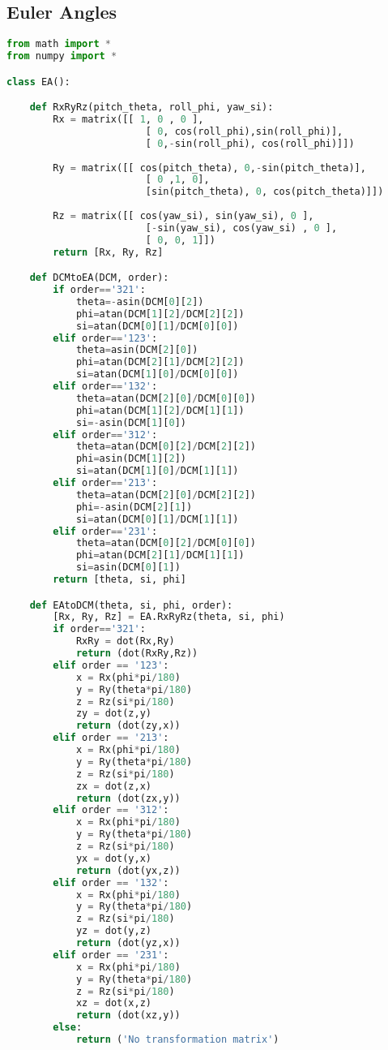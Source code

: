 \subsection{Euler Angles}
\begin{lstlisting}[language=python, caption= EA.py]
from math import *
from numpy import *

class EA():

    def RxRyRz(pitch_theta, roll_phi, yaw_si):
        Rx = matrix([[ 1, 0 , 0 ],
                        [ 0, cos(roll_phi),sin(roll_phi)],
                        [ 0,-sin(roll_phi), cos(roll_phi)]])
        
        Ry = matrix([[ cos(pitch_theta), 0,-sin(pitch_theta)],
                        [ 0 ,1, 0],
                        [sin(pitch_theta), 0, cos(pitch_theta)]])
        
        Rz = matrix([[ cos(yaw_si), sin(yaw_si), 0 ],
                        [-sin(yaw_si), cos(yaw_si) , 0 ],
                        [ 0, 0, 1]])
        return [Rx, Ry, Rz]

    def DCMtoEA(DCM, order):
        if order=='321':
            theta=-asin(DCM[0][2])
            phi=atan(DCM[1][2]/DCM[2][2])
            si=atan(DCM[0][1]/DCM[0][0])
        elif order=='123':
            theta=asin(DCM[2][0])  
            phi=atan(DCM[2][1]/DCM[2][2])
            si=atan(DCM[1][0]/DCM[0][0])
        elif order=='132':
            theta=atan(DCM[2][0]/DCM[0][0])
            phi=atan(DCM[1][2]/DCM[1][1])
            si=-asin(DCM[1][0])
        elif order=='312':
            theta=atan(DCM[0][2]/DCM[2][2])
            phi=asin(DCM[1][2])
            si=atan(DCM[1][0]/DCM[1][1])
        elif order=='213':
            theta=atan(DCM[2][0]/DCM[2][2])
            phi=-asin(DCM[2][1])
            si=atan(DCM[0][1]/DCM[1][1])
        elif order=='231':
            theta=atan(DCM[0][2]/DCM[0][0])
            phi=atan(DCM[2][1]/DCM[1][1])
            si=asin(DCM[0][1])
        return [theta, si, phi]

    def EAtoDCM(theta, si, phi, order):
        [Rx, Ry, Rz] = EA.RxRyRz(theta, si, phi)
        if order=='321':
            RxRy = dot(Rx,Ry)
            return (dot(RxRy,Rz))
        elif order == '123':
            x = Rx(phi*pi/180)
            y = Ry(theta*pi/180)
            z = Rz(si*pi/180)
            zy = dot(z,y)
            return (dot(zy,x))
        elif order == '213':
            x = Rx(phi*pi/180)
            y = Ry(theta*pi/180)
            z = Rz(si*pi/180)
            zx = dot(z,x)
            return (dot(zx,y))
        elif order == '312':
            x = Rx(phi*pi/180)
            y = Ry(theta*pi/180)
            z = Rz(si*pi/180)
            yx = dot(y,x)
            return (dot(yx,z))
        elif order == '132':
            x = Rx(phi*pi/180)
            y = Ry(theta*pi/180)
            z = Rz(si*pi/180)
            yz = dot(y,z)
            return (dot(yz,x))
        elif order == '231':
            x = Rx(phi*pi/180)
            y = Ry(theta*pi/180)
            z = Rz(si*pi/180)
            xz = dot(x,z)
            return (dot(xz,y))
        else:
            return ('No transformation matrix')


\end{lstlisting}
